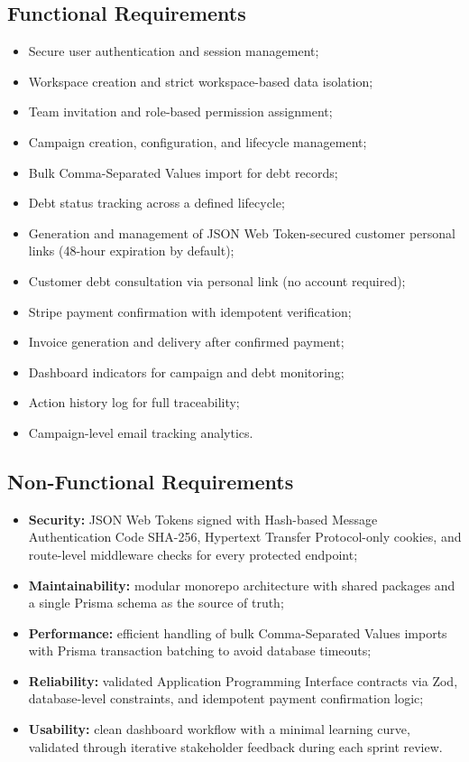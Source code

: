 \documentclass[12pt,a4paper]{report}
\begin{document}
\subsection{Functional Requirements}

\begin{itemize}
  \item Secure user authentication and session management;
  \item Workspace creation and strict workspace-based data isolation;
  \item Team invitation and role-based permission assignment;
  \item Campaign creation, configuration, and lifecycle management;
  \item Bulk Comma-Separated Values import for debt records;
  \item Debt status tracking across a defined lifecycle;
  \item Generation and management of JSON Web Token-secured customer personal links (48-hour expiration by default);
  \item Customer debt consultation via personal link (no account required);
  \item Stripe payment confirmation with idempotent verification;
  \item Invoice generation and delivery after confirmed payment;
  \item Dashboard indicators for campaign and debt monitoring;
  \item Action history log for full traceability;
  \item Campaign-level email tracking analytics.
\end{itemize}

\subsection{Non-Functional Requirements}

\begin{itemize}
  \item \textbf{Security:} JSON Web Tokens signed with Hash-based Message Authentication Code SHA-256, Hypertext Transfer Protocol-only cookies,
        and route-level middleware checks for every protected endpoint;
  \item \textbf{Maintainability:} modular monorepo architecture with shared packages
        and a single Prisma schema as the source of truth;
  \item \textbf{Performance:} efficient handling of bulk Comma-Separated Values imports with Prisma
        transaction batching to avoid database timeouts;
  \item \textbf{Reliability:} validated Application Programming Interface contracts via Zod, database-level constraints,
        and idempotent payment confirmation logic;
  \item \textbf{Usability:} clean dashboard workflow with a minimal learning curve,
        validated through iterative stakeholder feedback during each sprint review.
\end{itemize}
\end{document}

